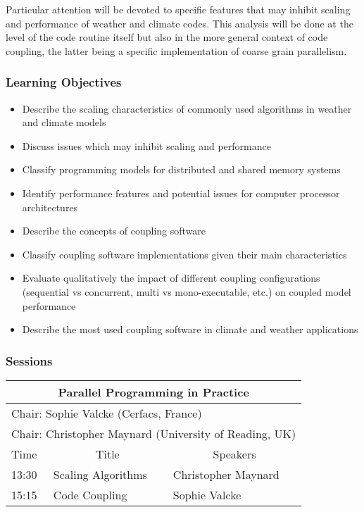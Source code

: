 Particular attention will be devoted to specific features that may inhibit scaling and performance of weather and climate codes. This analysis will be done at the level of the code routine itself but also in the more general context of code coupling, the latter being a specific implementation of coarse grain parallelism.

\subsubsection{Learning Objectives}

\begin{itemize}

\item Describe the scaling characteristics of commonly used algorithms in weather and climate models
\item Discuss issues which may inhibit scaling and performance
\item Classify programming models for distributed and shared memory systems
\item Identify performance features and potential issues for computer processor architectures
\item Describe the concepts of coupling software
\item Classify coupling software implementations given their main characteristics
\item Evaluate qualitatively the impact of different coupling configurations (sequential vs concurrent, multi vs mono-executable, etc.) on coupled model performance
\item Describe the most used coupling software in climate and weather applications

\end{itemize}

\subsubsection{Sessions}

\begin{table}[H]
\begin{center}
\begin{tabular}{|l|l|l|}
\hline
\multicolumn{3}{|c|}{\textbf{Parallel Programming in Practice}} \\ \hline
\multicolumn{3}{|l|}{Chair: Sophie Valcke (Cerfacs, France)} \\
\multicolumn{3}{|l|}{Chair: Christopher Maynard (University of Reading, UK)} \\ \hline \hline
Time & \multicolumn{1}{c|}{Title} & \multicolumn{1}{c|}{Speakers} \\ \hline \hline
13:30 & Scaling Algorithms & Christopher Maynard \\ \hline
15:15 & Code Coupling & Sophie Valcke \\ \hline
\end{tabular}
\end{center}
\end{table}

